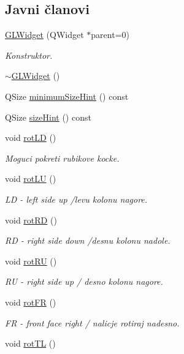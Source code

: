\subsection*{Javni članovi}
\begin{DoxyCompactItemize}
\item 
\hyperlink{classGLWidget_ab79c391c86de1ffb76f6950b49d82c0c}{G\+L\+Widget} (Q\+Widget $\ast$parent=0)
\begin{DoxyCompactList}\small\item\em Konstruktor. \end{DoxyCompactList}\item 
\hyperlink{classGLWidget_a535192a4262b4501e5493303834f45d3}{$\sim$\+G\+L\+Widget} ()
\item 
Q\+Size \hyperlink{classGLWidget_a942d1b558c1f2fa5fac1fef09f6526d0}{minimum\+Size\+Hint} () const
\item 
Q\+Size \hyperlink{classGLWidget_a108b4939019eafe1c6fcc73d7b8bd81e}{size\+Hint} () const
\item 
void \hyperlink{classGLWidget_aed9abc259552aa9ae08b2aed8b518b86}{rot\+LD} ()
\begin{DoxyCompactList}\small\item\em Moguci pokreti rubikove kocke. \end{DoxyCompactList}\item 
void \hyperlink{classGLWidget_a3b65174ae0eab3908457df7fb73fe210}{rot\+LU} ()
\begin{DoxyCompactList}\small\item\em LD -\/ left side up /levu kolonu nagore. \end{DoxyCompactList}\item 
void \hyperlink{classGLWidget_a6a2b5c679b2c66b0ac4df438c160ddcc}{rot\+RD} ()
\begin{DoxyCompactList}\small\item\em RD -\/ right side down /desnu kolonu nadole. \end{DoxyCompactList}\item 
void \hyperlink{classGLWidget_a968a9e56d6eb8dc0b5c444a8542433ed}{rot\+RU} ()\hypertarget{classGLWidget_a968a9e56d6eb8dc0b5c444a8542433ed}{}\label{classGLWidget_a968a9e56d6eb8dc0b5c444a8542433ed}

\begin{DoxyCompactList}\small\item\em RU -\/ right side up / desno kolonu nagore. \end{DoxyCompactList}\item 
void \hyperlink{classGLWidget_adafb904dd1e479aeb025422b6657f47b}{rot\+FR} ()
\begin{DoxyCompactList}\small\item\em FR -\/ front face right / nalicje rotiraj nadesno. \end{DoxyCompactList}\item 
void \hyperlink{classGLWidget_a711e00bc6e62bfa436c7674f992c1ac3}{rot\+TL} ()\hypertarget{classGLWidget_a711e00bc6e62bfa436c7674f992c1ac3}{}\label{classGLWidget_a711e00bc6e62bfa436c7674f992c1ac3}


\end{DoxyCompactItemize}
